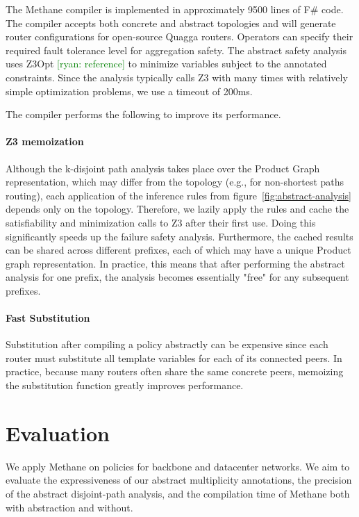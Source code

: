 \documentclass{sig-alternate-10pt}
\newcommand{\ryan}[1]{\textcolor{green}{[ryan: #1]}}
\newcommand{\sysname}{{\small \sf Methane}\xspace}
\newcommand{\para}[1]{\paragraph*{\textbf{#1}}}
\begin{document}
The \sysname compiler is implemented in approximately 9500 lines of F\# code. The compiler accepts both concrete and abstract topologies and will generate router configurations for open-source Quagga routers. Operators can specify their required fault tolerance level for aggregation safety. The abstract safety analysis uses Z3Opt \ryan{reference} to minimize variables subject to the annotated constraints. Since the analysis typically calls Z3 with many times with relatively simple optimization problems, we use a timeout of 200ms.

The compiler performs the following to improve its performance.

\para{Z3 memoization}

Although the k-disjoint path analysis takes place over the Product Graph representation, which may differ from the topology (e.g., for non-shortest paths routing), each application of the inference rules from figure~\ref{fig:abstract-analysis} depends only on the topology. Therefore, we lazily apply the rules and cache the satisfiability and minimization calls to Z3 after their first use. Doing this significantly speeds up the failure safety analysis. Furthermore, the cached results can be shared across different prefixes, each of which may have a unique Product graph representation. In practice, this means that after performing the abstract analysis for one prefix, the analysis becomes essentially "free" for any subsequent prefixes.

\para{Fast Substitution}

Substitution after compiling a policy abstractly can be expensive since each router must substitute all template variables for each of its connected peers. In practice, because many routers often share the same concrete peers, memoizing the substitution function greatly improves performance.


%
%
%
%


\section{Evaluation}
\label{sec:evaluation}

We apply \sysname on policies for backbone and datacenter networks. We aim to evaluate the expressiveness of our abstract multiplicity annotations, the precision of the abstract disjoint-path analysis, and the compilation time of \sysname both with abstraction and without.
\end{document}
